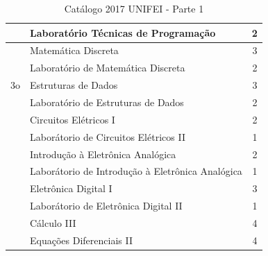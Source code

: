 \documentclass[12pt]{article} %
\begin{document}
\begin{table}[H]
\begin{tabular}{|c|l|c|}
                     & Laboratório Técnicas de Programação                   & 2        \\ \hline
\multirow{5}{*}{3o}  
					& Matemática Discreta                                       & 3        \\ \cline{2-3} 
				    & Laboratório de Matemática Discreta                                        & 2        \\ \cline{2-3} 
				    & Estruturas de Dados                                        & 3        \\ \cline{2-3} 
				    & Laboratório de Estruturas de Dados                                        & 2        \\ \cline{2-3} 
					& Circuitos Elétricos I                                     & 2        \\ \cline{2-3} 
                      & Laborátorio de Circuitos Elétricos II                                     & 1        \\ \cline{2-3} 
                      	& Introdução à Eletrônica Analógica                                     & 2        \\ \cline{2-3} 
                      & Laborátorio de Introdução à Eletrônica Analógica                                    & 1        \\ \cline{2-3} 
                      & Eletrônica Digital I                                     & 3        \\ \cline{2-3} 
                      & Laborátorio de Eletrônica Digital II                                  & 1        \\ \cline{2-3} 
					& Cálculo III                                                & 4        \\ \cline{2-3} 
                      & Equações Diferenciais II                                    & 4        \\ \hline
\end{tabular}
\caption{Catálogo 2017 UNIFEI -  Parte 1}
\label{catalago1}
\end{table}
\end{document}

